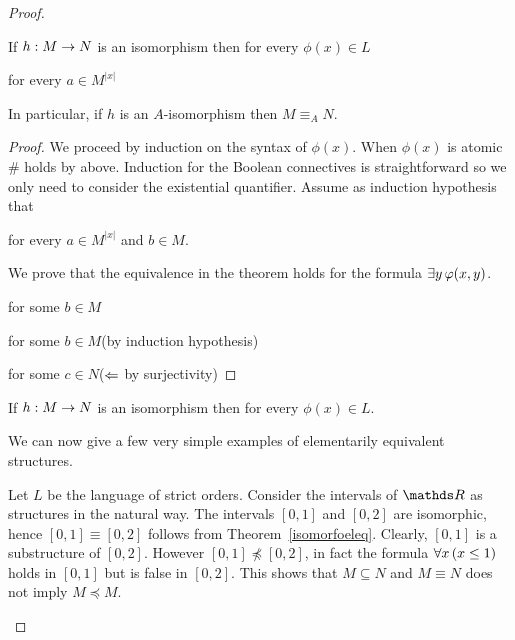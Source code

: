 \begin{proof}
\begin{theorem}\label{isomorfoeleq}
If $h:M\rightarrow N$ is an isomorphism then for every $\phi(x)\in L$

 for every $a\in M^{|x|}$

In particular, if $h$ is an $A$-isomorphism then $M\equiv_A N$.
\end{theorem}

\begin{proof}
  We proceed by induction on the syntax of $\phi(x)$.
  When $\phi(x)$ is atomic \# holds by  above.
  Induction for the Boolean connectives is straightforward so we only need to consider the existential quantifier.
  Assume as induction hypothesis that


   for every $a\in M^{|x|}$ and $b\in M$.

We prove that the equivalence in the theorem holds for the formula $\exists y\,\varphi(x,y)$.



 for some $b\in M$

 for some $b\in M$\hfill (by induction hypothesis)

for some $c\in N$\hfill ($\Leftarrow$ by surjectivity)

\end{proof}


\begin{corollary}\label{corol_def_set_invariant}
If $h:M\rightarrow N$ is an isomorphism then for every $\phi(x)\in L$.

\end{corollary}

We can now give a few very simple examples of elementarily equivalent structures.

\begin{example}\label{expl_ordini_elem}
Let $L$ be the language of strict orders.
Consider the intervals of $\RR$ as structures in the natural way.
The intervals $[0,1]$ and $[0,2]$ are isomorphic, hence $[0,1]\equiv[0,2]$ follows from Theorem~\ref{isomorfoeleq}.
Clearly, $[0,1]$ is a substructure of $[0,2]$.
However $[0,1]\npreceq [0,2]$, in fact the formula $\forall  x\,(x\le1)$ holds in $[0,1]$ but is false in $[0,2]$.
This shows that $M\subseteq N$ and $M\equiv N$ does not imply $M\preceq M$.


\end{example}
\end{proof}
